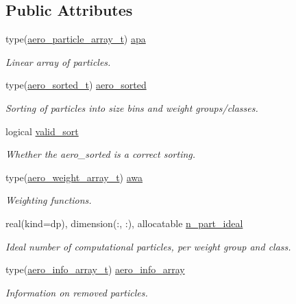 \subsection*{Public Attributes}
\begin{DoxyCompactItemize}
\item 
type(\mbox{\hyperlink{structpmc__aero__particle__array_1_1aero__particle__array__t}{aero\+\_\+particle\+\_\+array\+\_\+t}}) \mbox{\hyperlink{structpmc__aero__state_1_1aero__state__t_aa8fd1e1c085328e5590a53b78ccd5083}{apa}}
\begin{DoxyCompactList}\small\item\em Linear array of particles. \end{DoxyCompactList}\item 
type(\mbox{\hyperlink{structpmc__aero__sorted_1_1aero__sorted__t}{aero\+\_\+sorted\+\_\+t}}) \mbox{\hyperlink{structpmc__aero__state_1_1aero__state__t_a0a9922991b84778a0f7e6746bb5cd007}{aero\+\_\+sorted}}
\begin{DoxyCompactList}\small\item\em Sorting of particles into size bins and weight groups/classes. \end{DoxyCompactList}\item 
logical \mbox{\hyperlink{structpmc__aero__state_1_1aero__state__t_a658063f2e8d9bad5f3aca1fb37eac4eb}{valid\+\_\+sort}}
\begin{DoxyCompactList}\small\item\em Whether the {\ttfamily aero\+\_\+sorted} is a correct sorting. \end{DoxyCompactList}\item 
type(\mbox{\hyperlink{structpmc__aero__weight__array_1_1aero__weight__array__t}{aero\+\_\+weight\+\_\+array\+\_\+t}}) \mbox{\hyperlink{structpmc__aero__state_1_1aero__state__t_a322768c555858c5594926be7bba8133d}{awa}}
\begin{DoxyCompactList}\small\item\em Weighting functions. \end{DoxyCompactList}\item 
real(kind=dp), dimension(\+:, \+:), allocatable \mbox{\hyperlink{structpmc__aero__state_1_1aero__state__t_a48717ad80eecaa0e179ae2dd7b081db2}{n\+\_\+part\+\_\+ideal}}
\begin{DoxyCompactList}\small\item\em Ideal number of computational particles, per weight group and class. \end{DoxyCompactList}\item 
type(\mbox{\hyperlink{structpmc__aero__info__array_1_1aero__info__array__t}{aero\+\_\+info\+\_\+array\+\_\+t}}) \mbox{\hyperlink{structpmc__aero__state_1_1aero__state__t_a2fe4dc14d229409549af2aa7876a974c}{aero\+\_\+info\+\_\+array}}
\begin{DoxyCompactList}\small\item\em Information on removed particles. \end{DoxyCompactList}\end{DoxyCompactItemize}


